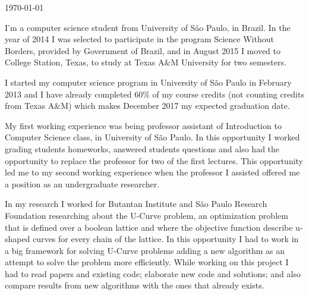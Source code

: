 \documentclass[11pt, a4paper]{awesome-cv}
\begin{document}
\makecvheader

\makecvfooter
  {\today}
  {}
  {}



\begin{cvletter}
\par I'm a computer science student from University of São Paulo, in Brazil. In the year of 2014 I was selected to participate in the program Science Without Borders, provided by Government of Brazil, and in  August 2015 I moved to College Station, Texas, to study at Texas A\&M University for two semesters.
\par I started my computer science program in University of São Paulo in February 2013 and I have already completed 60\% of my course credits (not counting credits from Texas A\&M) which makes December 2017 my expected graduation date.

\par My first working experience  was being professor assistant of Introduction to Computer Science class, in University of São Paulo. In this opportunity I worked grading students homeworks, answered students questions and also had the opportunity to replace the professor for two of the first lectures. This opportunity led me to my second working experience when the professor I assisted offered me a position as an undergraduate researcher.
\par In my research I worked for Butantan Institute and São Paulo Research Foundation researching about the U-Curve problem, an optimization problem that is defined over a boolean lattice and where the objective function describe u-shaped curves for every chain of the lattice. In this opportunity I had to work in a big framework for solving U-Curve problems adding a new algorithm as an attempt to solve the problem more efficiently. While working on this project I had to read papers and existing code; elaborate new code and solutions; and also compare results from new algorithms with the ones that already exists.


\end{cvletter}
\end{document}
